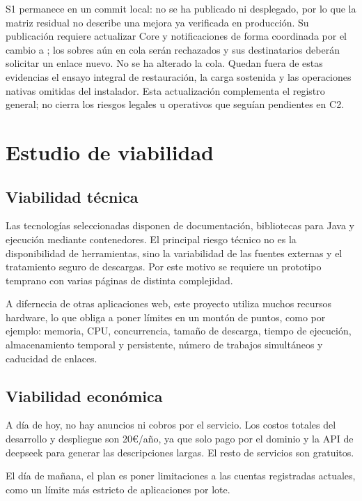S1 permanece en un commit local: no se ha publicado ni desplegado, por lo que la matriz residual no describe una mejora ya verificada en producción. Su publicación requiere actualizar Core y notificaciones de forma coordinada por el cambio a ; los sobres  aún en cola serán rechazados y sus destinatarios deberán solicitar un enlace nuevo. No se ha alterado la cola. Quedan fuera de estas evidencias el ensayo integral de restauración, la carga sostenida y las operaciones nativas omitidas del instalador. Esta actualización complementa el registro general; no cierra los riesgos legales u operativos que seguían pendientes en C2.

\section{Estudio de viabilidad}

\subsection{Viabilidad técnica}

Las tecnologías seleccionadas disponen de documentación, bibliotecas para Java y ejecución mediante contenedores. El principal riesgo técnico no es la disponibilidad de herramientas, sino la variabilidad de las fuentes externas y el tratamiento seguro de descargas. Por este motivo se requiere un prototipo temprano con varias páginas de distinta complejidad.

A difernecia de otras aplicaciones web, este proyecto utiliza muchos recursos hardware, lo que obliga a poner límites en un montón de puntos, como por ejemplo: memoria, CPU, concurrencia, tamaño de descarga, tiempo de ejecución, almacenamiento temporal y persistente, número de trabajos simultáneos y caducidad de enlaces.

\subsection{Viabilidad económica}

A día de hoy, no hay anuncios ni cobros por el servicio. Los costos totales del desarrollo y despliegue son 20€/año, ya que solo pago por el dominio y la API de deepseek para generar las descripciones largas. El resto de servicios son gratuitos.

El día de mañana, el plan es poner limitaciones a las cuentas registradas actuales, como un límite más estricto de aplicaciones por lote.

